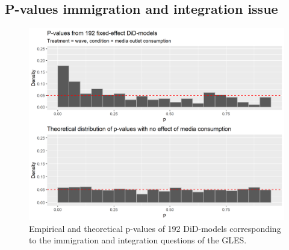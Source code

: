 \documentclass{article}
\begin{document}
\subsection{P-values immigration and integration issue}\label{app:p-val_imm}

\begin{figure}[!ht]
    \centering
    \includegraphics[width=\textwidth]{paper/vis/DiD_model_ps_immint.png}
    \caption{Empirical and theoretical p-values of 192 DiD-models corresponding to the immigration and integration questions of the GLES.}
    \label{fig:p-val_imm}
\end{figure}
\end{document}
